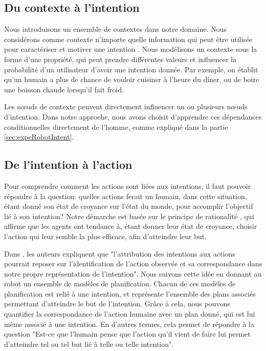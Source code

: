 \documentclass[a4paper,11pt,twoside]{StyleThese}
\begin{document}
\subsection{Du contexte à l'intention}
Nous introduisons un ensemble de contextes dans notre domaine. Nous considérons comme contexte n'importe quelle information qui peut être utilisée pour caractériser et motiver une intention \cite{abowd1999towards}. Nous modélisons un contexte sous la forme d'une propriété, qui peut prendre différentes valeurs et influencer la probabilité d'un utilisateur d'avoir une intention donnée. Par exemple, on établit qu'un humain a plus de chance de vouloir cuisiner à l'heure du dîner, ou de boire une boisson chaude lorsqu'il fait froid.

Les nœuds de contexte peuvent directement influencer un ou plusieurs nœuds d'intention. Dans notre approche, nous avons choisit d'apprendre ces dépendances conditionnelles directement de l'homme, comme expliqué dans la partie \ref{sec:expeRobotIntent}.

\subsection{De l'intention à l'action}
\label{action_evaluation}
Pour comprendre comment les actions sont liées aux intentions, il faut pouvoir répondre à la question: quelles actions ferait un humain, dans cette situation, étant donné son état de croyance sur l'état du monde, pour accomplir l'objectif lié à son intention? 
Notre démarche est basée sur le principe de rationalité \cite{Dennet1989}, qui affirme que les agents ont tendance à, étant donner leur état de croyance, choisir l'action qui leur semble la plus efficace, afin d'atteindre leur but.

Dans \cite{Blakemore2001}, les auteurs expliquent que "l'attribution des intentions aux actions pourrait reposer sur l'identification de l'action observée et sa correspondance dans notre propre représentation de l'intention". Nous suivons cette idée en donnant au robot un ensemble de modèles de planification. Chacun de ces modèles de planification est relié à une intention, et représente l'ensemble des plans associés permettant d'atteindre le but de l'intention. Grâce à cela, nous pouvons quantifier la correspondance de l'action humaine avec un plan donné, qui est lui même associé à une intention. En d'autres termes, cela permet de répondre à la question "Est-ce que l'humain pense que l'action qu'il vient de faire lui permet d'atteindre tel ou tel but lié à telle ou telle intention".
\end{document}
